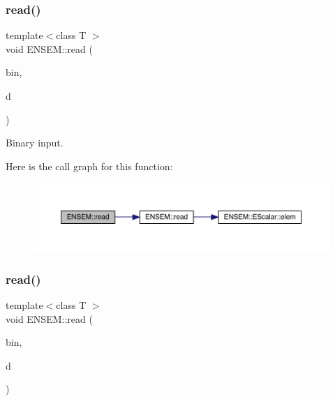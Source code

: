 \subsubsection{\texorpdfstring{read()}{read()}\hspace{0.1cm}{\footnotesize\ttfamily [5/11]}}
{\footnotesize\ttfamily template$<$class T $>$ \\
void E\+N\+S\+E\+M\+::read (\begin{DoxyParamCaption}\item[{\mbox{\hyperlink{classADATIO_1_1BinaryReader}{A\+D\+A\+T\+I\+O\+::\+Binary\+Reader}} \&}]{bin,  }\item[{\mbox{\hyperlink{classENSEM_1_1EScalar}{E\+Scalar}}$<$ \mbox{\hyperlink{classENSEM_1_1OScalar}{O\+Scalar}}$<$ T $>$ $>$ \&}]{d }\end{DoxyParamCaption})\hspace{0.3cm}{\ttfamily [inline]}}



Binary input. 

Here is the call graph for this function\+:\nopagebreak
\begin{figure}[H]
\begin{center}
\leavevmode
\includegraphics[width=350pt]{d2/d94/namespaceENSEM_ac9e6dd1b65ee654fcdc9d028ba4f1254_cgraph}
\end{center}
\end{figure}
\mbox{\label{namespaceENSEM_a263669f863c2a53acb71cfc540a21e0f}} 
\subsubsection{\texorpdfstring{read()}{read()}\hspace{0.1cm}{\footnotesize\ttfamily [6/11]}}
{\footnotesize\ttfamily template$<$class T $>$ \\
void E\+N\+S\+E\+M\+::read (\begin{DoxyParamCaption}\item[{\mbox{\hyperlink{classADATIO_1_1BinaryReader}{A\+D\+A\+T\+I\+O\+::\+Binary\+Reader}} \&}]{bin,  }\item[{\mbox{\hyperlink{classENSEM_1_1EScalar}{E\+Scalar}}$<$ \mbox{\hyperlink{classENSEM_1_1OVector}{O\+Vector}}$<$ T $>$ $>$ \&}]{d }\end{DoxyParamCaption})\hspace{0.3cm}{\ttfamily [inline]}}



